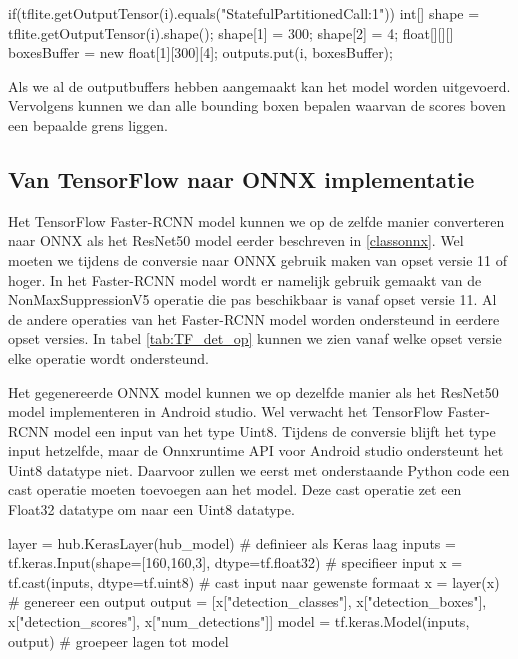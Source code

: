\begin{python}
if(tflite.getOutputTensor(i).equals("StatefulPartitionedCall:1")) {
    int[] shape = tflite.getOutputTensor(i).shape();
    shape[1] = 300;
    shape[2] = 4;
    float[][][] boxesBuffer = new float[1][300][4];
    outputs.put(i, boxesBuffer);
}
\end{python}

Als we al de outputbuffers hebben aangemaakt kan het model worden uitgevoerd.
Vervolgens kunnen we dan alle bounding boxen bepalen waarvan de scores boven een bepaalde grens liggen.

\subsection{Van TensorFlow naar ONNX implementatie}
Het TensorFlow Faster-RCNN model kunnen we op de zelfde manier converteren naar ONNX als het ResNet50 model eerder beschreven in \ref{classonnx}.
Wel moeten we tijdens de conversie naar ONNX gebruik maken van opset versie 11 of hoger.
In het Faster-RCNN model wordt er namelijk gebruik gemaakt van de NonMaxSuppressionV5 operatie die pas beschikbaar is vanaf opset versie 11.
Al de andere operaties van het Faster-RCNN model worden ondersteund in eerdere opset versies.
In tabel \ref{tab:TF_det_op} kunnen we zien vanaf welke opset versie elke operatie wordt ondersteund.

Het gegenereerde ONNX model kunnen we op dezelfde manier als het ResNet50 model implementeren in Android studio.
Wel verwacht het TensorFlow Faster-RCNN model een input van het type Uint8.
Tijdens de conversie blijft het type input hetzelfde, maar de Onnxruntime API voor Android studio ondersteunt het Uint8 datatype niet.
Daarvoor zullen we eerst met onderstaande Python code een cast operatie moeten toevoegen aan het model.
Deze cast operatie zet een Float32 datatype om naar een Uint8 datatype.

\begin{python}
layer = hub.KerasLayer(hub_model) # definieer als Keras laag
inputs = tf.keras.Input(shape=[160,160,3], dtype=tf.float32) # specifieer input
x = tf.cast(inputs, dtype=tf.uint8) # cast input naar gewenste formaat
x = layer(x) # genereer een output
output = [x["detection_classes"], x["detection_boxes"], x["detection_scores"], x["num_detections"]]
model = tf.keras.Model(inputs, output) # groepeer lagen tot model
\end{python}


